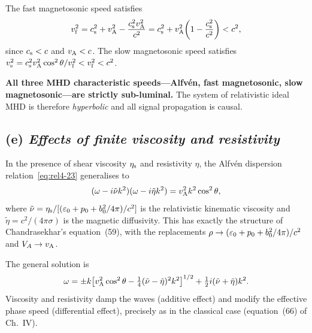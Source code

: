 \begin{causalitycheck}
The fast magnetosonic speed satisfies
\begin{equation}\label{eq:rel4-28}
  v_{\mathrm{f}}^{2} = c_{\mathrm{s}}^{2} + v_{\mathrm{A}}^{2} - \frac{c_{\mathrm{s}}^{2}v_{\mathrm{A}}^{2}}{c^{2}}
  = c_{\mathrm{s}}^{2}+v_{\mathrm{A}}^{2}\!\left(1-\frac{c_{\mathrm{s}}^{2}}{c^{2}}\right) < c^{2},
\end{equation}
since $c_{\mathrm{s}}<c$ and $v_{\mathrm{A}}<c$.  The slow magnetosonic speed satisfies
$v_{\mathrm{s}}^{2} = c_{\mathrm{s}}^{2}v_{\mathrm{A}}^{2}\cos^{2}\theta/v_{\mathrm{f}}^{2} < v_{\mathrm{f}}^{2} < c^{2}$.

\medskip\noindent
\textbf{All three MHD characteristic speeds---Alfv\'en, fast magnetosonic,
slow magnetosonic---are strictly sub-luminal.}  The system of relativistic
ideal MHD is therefore \emph{hyperbolic} and all signal propagation is
causal.
\end{causalitycheck}

\subsection*{(e) \emph{Effects of finite viscosity and resistivity}}

In the presence of shear viscosity $\eta_{\mathrm{s}}$ and resistivity $\eta$,
the Alfv\'en dispersion relation~\eqref{eq:rel4-23} generalises to
\begin{equation}\label{eq:rel4-29}
  (\omega - i\tilde{\nu}k^{2})(\omega - i\tilde{\eta}k^{2})
  = v_{\mathrm{A}}^{2}k^{2}\cos^{2}\theta,
\end{equation}
where $\tilde{\nu}=\eta_{\mathrm{s}}/[(\varepsilon_{0}+p_{0}+b^2_{0}/4\pi)/c^{2}]$
is the relativistic kinematic viscosity and $\tilde{\eta}=c^{2}/(4\pi\sigma)$
is the magnetic diffusivity.  This has exactly the structure of
Chandrasekhar's equation~(59), with the replacements $\rho\to
(\varepsilon_{0}+p_{0}+b^2_{0}/4\pi)/c^{2}$ and $V_{A}\to v_{\mathrm{A}}$.

The general solution is
\begin{equation}\label{eq:rel4-30}
  \omega = \pm k\!\left[v_{\mathrm{A}}^{2}\cos^{2}\theta
    - \tfrac{1}{4}(\tilde{\nu}-\tilde{\eta})^{2}k^{2}\right]^{1/2}
  + \tfrac{1}{2}i(\tilde{\nu}+\tilde{\eta})k^{2}.
\end{equation}
Viscosity and resistivity damp the waves (additive effect) and modify the
effective phase speed (differential effect), precisely as in the classical
case (equation~(66) of Ch.~IV).

